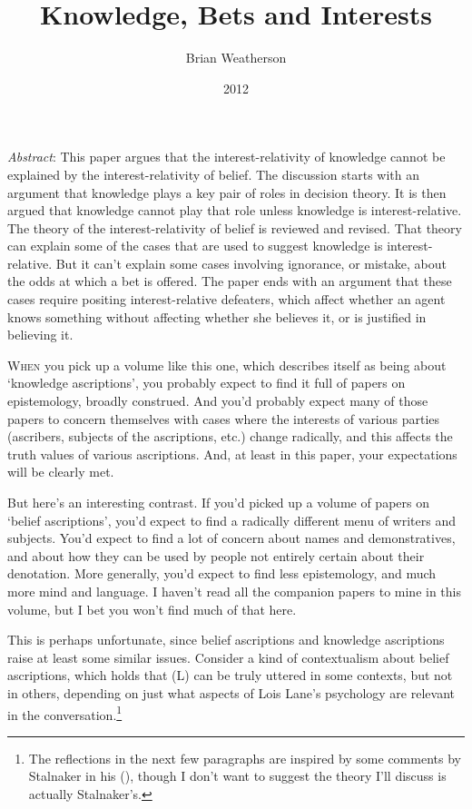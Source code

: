 \documentclass[
  11pt,
  letterpaper,
  DIV=11,
  numbers=noendperiod,
  twoside]{scrartcl}
\title{Knowledge, Bets and Interests}
\author{Brian Weatherson}
\date{2012}
\renewenvironment{abstract}
 {\vspace{-1.25cm}
 \quotation\small\noindent\emph{Abstract}:}
 {\endquotation}
\renewenvironment{abstract}
 {\quotation\small\noindent\emph{Abstract}:}
 {\endquotation\vspace{-0.02cm}}
\begin{document}
\maketitle
\begin{abstract}
This paper argues that the interest-relativity of knowledge cannot be
explained by the interest-relativity of belief. The discussion starts
with an argument that knowledge plays a key pair of roles in decision
theory. It is then argued that knowledge cannot play that role unless
knowledge is interest-relative. The theory of the interest-relativity of
belief is reviewed and revised. That theory can explain some of the
cases that are used to suggest knowledge is interest-relative. But it
can't explain some cases involving ignorance, or mistake, about the odds
at which a bet is offered. The paper ends with an argument that these
cases require positing interest-relative defeaters, which affect whether
an agent knows something without affecting whether she believes it, or
is justified in believing it.
\end{abstract}


\lettrine{W}{hen} you pick up a volume like this one, which describes
itself as being about `knowledge ascriptions', you probably expect to
find it full of papers on epistemology, broadly construed. And you'd
probably expect many of those papers to concern themselves with cases
where the interests of various parties (ascribers, subjects of the
ascriptions, etc.) change radically, and this affects the truth values
of various ascriptions. And, at least in this paper, your expectations
will be clearly met.

But here's an interesting contrast. If you'd picked up a volume of
papers on `belief ascriptions', you'd expect to find a radically
different menu of writers and subjects. You'd expect to find a lot of
concern about names and demonstratives, and about how they can be used
by people not entirely certain about their denotation. More generally,
you'd expect to find less epistemology, and much more mind and language.
I haven't read all the companion papers to mine in this volume, but I
bet you won't find much of that here.

This is perhaps unfortunate, since belief ascriptions and knowledge
ascriptions raise at least some similar issues. Consider a kind of
contextualism about belief ascriptions, which holds that (L) can be
truly uttered in some contexts, but not in others, depending on just
what aspects of Lois Lane's psychology are relevant in the
conversation.\footnote{The reflections in the next few paragraphs are
  inspired by some comments by Stalnaker in his
  (), though I don't want to suggest
  the theory I'll discuss is actually Stalnaker's.}
\end{document}

